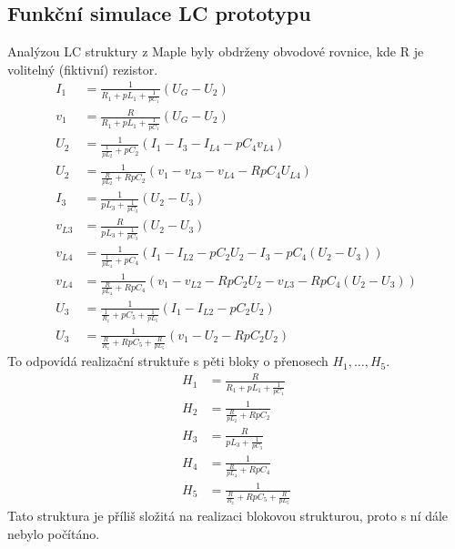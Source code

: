 \subsection{Funkční simulace LC prototypu}\label{s:KASK}
\noindent Analýzou LC struktury z Maple byly obdrženy obvodové rovnice, kde R je volitelný (fiktivní) rezistor.
\begin{align}
I_1 &= \frac{1}{R_1 + pL_1 + \frac{1}{pC_1}}(U_G - U_2)\\
v_1 & = \frac{R}{R_1 + pL_1 + \frac{1}{pC_1}}(U_G - U_2)\\
U_2 &= \frac{1}{\frac{1}{pL_2} + pC_2}(I_1 - I_{3} - I_{L4} - pC_4 v_{L4})\\
U_2 &= \frac{1}{\frac{R}{pL_2} + RpC_2}(v_1 - v_{L3} - v_{L4} - RpC_4 U_{L4})\\
I_{3} &= \frac{1}{pL_3 + \frac{1}{pC_3}}(U_2 - U_3)\\
v_{L3} &= \frac{R}{pL_3 + \frac{1}{pC_3}}(U_2 - U_3)\\
v_{L4} &= \frac{1}{\frac{1}{pL_4}+pC_4}(I_1 - I_{L2} - pC_2U_2 - I_{3} - pC_4 (U_2 - U_3))\\
v_{L4} &= \frac{1}{\frac{R}{pL_4}+RpC_4}(v_1 - v_{L2} - RpC_2U_2 - v_{L3} - RpC_4 (U_2 - U_3))\\
U_3 &= \frac{1}{\frac{1}{R_z}+pC_5 + \frac{1}{pL_5}}(I_1 - I_{L2} - pC_2U_2)\\
U_3 &= \frac{1}{\frac{R}{R_z}+RpC_5 + \frac{R}{pL_5}}(v_1 - U_2 - RpC_2 U_2)
\end{align}
\noindent To odpovídá realizační struktuře s pěti bloky o přenosech $H_1, \ldots,H_5$.
\begin{align}
H_1 & = \frac{R}{R_1 + pL_1 + \frac{1}{pC_1}}\\
H_2 &= \frac{1}{\frac{R}{pL_2} + RpC_2}\\
H_3 &= \frac{R}{pL_3 + \frac{1}{pC_3}}\\
H_4 &= \frac{1}{\frac{R}{pL_4}+RpC_4}\\
H_5 &= \frac{1}{\frac{R}{R_z}+RpC_5 + \frac{R}{pL_5}}
\end{align}
\noindent Tato struktura je příliš složitá na realizaci blokovou strukturou, proto s ní dále nebylo počítáno. 
